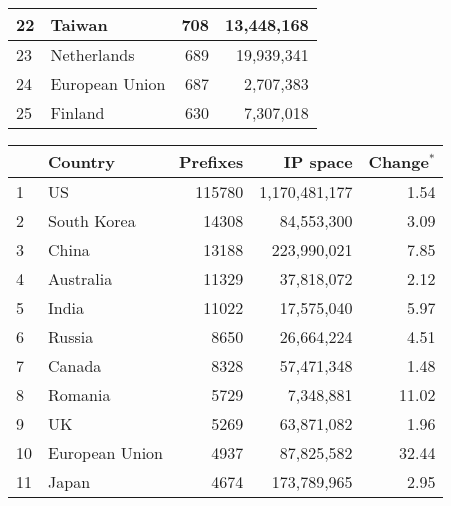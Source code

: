 \begin{table*}[p]
\begin{minipage}[t]{0.48\textwidth}
\begin{center}
\begin{tabular}{|l||l|r|r|}
22      &       Taiwan  		&       708     &       13,448,168      \tabularnewline \hline
23      &       Netherlands     &       689     &       19,939,341      \tabularnewline \hline
24      &       European Union  &       687     &       2,707,383       \tabularnewline \hline
25      &       Finland 		&       630     &       7,307,018       \tabularnewline \hline
	\end{tabular}
	\end{center}
\end{minipage}
%
\quad
%
\begin{minipage}[t]{0.48\textwidth}
	\begin{center}
	\caption{Top 25 countries with the most number of announced prefixes in BGP table on \textbf{April 23, 2009}}
	\label{tab:top25 bgp prefixes 2009}
	\begin{tabular}{|l||l|r|r|r|}
		\hline
		&      \bf Country		& \bf Prefixes  &       \bf IP space 	& \bf Change$^{*}$ 	\tabularnewline \hline 
1       &       US      		&       115780  &       1,170,481,177   & 1.54			\tabularnewline \hline
2       &       South Korea     &       14308   &       84,553,300      & 3.09			\tabularnewline \hline
3       &       China  			&       13188   &       223,990,021     & 7.85			\tabularnewline \hline
4       &       Australia       &       11329   &       37,818,072      & 2.12			\tabularnewline \hline
5       &       India   		&       11022   &       17,575,040      & 5.97			\tabularnewline \hline
6       &       Russia  		&       8650    &       26,664,224      & 4.51			\tabularnewline \hline
7       &       Canada  		&       8328    &       57,471,348      & 1.48			\tabularnewline \hline
8       &       Romania 		&       5729    &       7,348,881       & 11.02			\tabularnewline \hline
9       &       UK      		&       5269    &       63,871,082      & 1.96			\tabularnewline \hline
10      &       European Union  &       4937    &       87,825,582      & 32.44			\tabularnewline \hline
11      &       Japan   		&       4674    &       173,789,965     & 2.95			\tabularnewline \hline

\end{tabular}
\end{center}
\end{minipage}
\end{table*}
